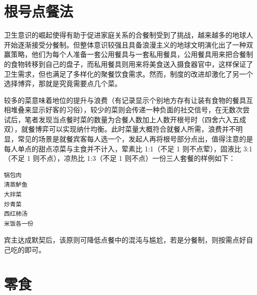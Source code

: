 \documentclass[
  letterpaper,
  DIV=11,
  numbers=noendperiod]{scrreprt}
\begin{document}
\section{根号点餐法}\label{ux6839ux53f7ux70b9ux9910ux6cd5}

卫生意识的崛起使得有助于促进家庭关系的合餐制受到了挑战，越来越多的地球人开始逐渐接受分餐制。但整体意识较强且具备浪漫主义的地球文明演化出了一种双赢策略，他们为每个人准备一套公用餐具与一套私用餐具，公用餐具用来把合餐制的食物转移到自己的盘子，而私用餐具则用来将美食送入摄食器官中，这样保证了卫生需求，但也满足了多样化的聚餐饮食需求。然而，制度的改进却激化了另一个选择博弈，那就是究竟需要点几个菜。

较多的菜意味着地位的提升与浪费（有记录显示个别地方存有让装有食物的餐具互相堆叠来显示好客的习俗），较少的菜则会传递一种负面的社交信号，在无数次尝试后，笔者发现当点餐时菜的数量为合餐人数加上人数开根号时（四舍六入五成双），就餐博弈可以实现纳什均衡。此时菜量大概符合就餐人所需，浪费并不明显，常见的场景是就餐宾客每人选一个，发起人再将根号部分点出，值得注意的是每人单点的甜点凉菜与主食并不计入，荤素比
1:1（不足 1 则不点荤），固液比 3:1（不足 1 则不点），凉热比 1:3（不足 1
则不点）一份三人套餐的样例如下：

\begin{verbatim}
锅包肉
清蒸鲈鱼
大拌菜
炒青菜
西红柿汤
米饭各一份
\end{verbatim}

宾主达成默契后，该原则可降低点餐中的混沌与尴尬，若是分餐制，则按需点好自己吃的即可。

\section{零食}\label{ux96f6ux98df}
\end{document}
